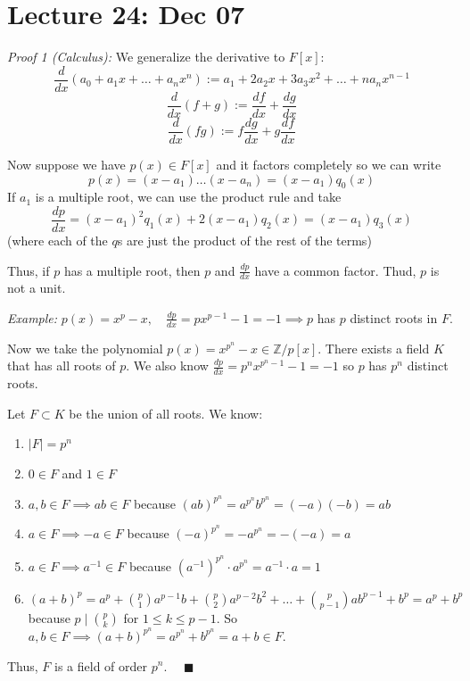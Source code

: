 \documentclass[12pt]{report}
\newcommand{\qed}{\quad \blacksquare}
\newcommand{\Z}{\mathbb{Z}}
\newcommand{\abs}[1]{\left\vert #1 \right\vert}
\newenvironment*{tbox}[3][breakable]{
    \begin{tcolorbox}[
        parbox=false,
        colback=#2!5!white,
        colframe=#2!75!black,
        title={#3},
        #1
    ]}
    {\end{tcolorbox}}
\begin{document}
\section*{Lecture 24: Dec 07}
    \begin{tbox}{gray}{\textbf{Theorem:} If $p$ is prime and $n \geq 1$, there exists a field of order $p^n$}
        \emph{Proof 1 (Calculus):} We generalize the derivative to $F[x]$:
        \[\frac{d}{dx}(a_0 + a_1 x + \dots + a_n x^n) := a_1 + 2a_2 x + 3a_3x^2 + \dots + na_nx^{n-1}\]
        \[\frac{d}{dx}(f +g) := \frac{df}{dx} + \frac{dg}{dx}\]
        \[\frac{d}{dx}(fg) := f\frac{dg}{dx} + g \frac{df}{dx}\]

        Now suppose we have $p(x) \in F[x]$ and it factors completely so we can write 
        \[p(x) = (x - a_1) \dots (x - a_n) = (x - a_1)q_0(x)\]
        If $a_1$ is a multiple root, we can use the product rule and take 
        \[\frac{dp}{dx} = (x - a_1)^2 q_1(x) + 2(x- a_1) q_2(x) = (x - a_1) q_3(x)\]
        (where each of the $q$s are just the product of the rest of the terms)

        Thus, if $p$ has a multiple root, then $p$ and $\frac{dp}{dx}$ have a common factor. Thud, $p$ is not a unit. 

        \emph{Example:} $p(x) = x^p - x, \quad \frac{dp}{dx} = px^{p-1} - 1 = -1 \implies p$ has $p$ distinct roots in $F$.

        Now we take the polynomial $p(x) = x^{p^n} - x \in \Z/p[x]$. There exists a field $K$ that has all roots of $p$. We also know $\frac{dp}{dx} = p^nx^{p^n-1} -1 = -1$ so $p$ has $p^n$ distinct roots. 

        Let $F \subset K$ be the union of all roots. We know:
        \begin{enumerate}
            \item $\abs{F} = p^n$
            \item $0 \in F$ and $1 \in F$
            \item $a, b \in F \implies ab \in F$ because $(ab)^{p^n} = a^{p^n}b^{p^n} = (-a)(-b) = ab$
            \item $a \in F \implies -a \in F$ because $(-a)^{p^n} = -a^{p^n} = -(-a) = a$
            \item $a \in F \implies a^{-1} \in F$ because $(a^{-1})^{p^n} \cdot a^{p^n} = a^{-1} \cdot a = 1$
            \item $(a + b)^p = a^p + \binom{p}{1} a^{p-1}b + \binom{p}{2}a^{p-2}b^2 + \dots + \binom{p}{p-1}ab^{p-1} + b^p = a^p + b^p$ because $p \mid \binom{p}{k}$ for $1 \leq k \leq p-1$. So $a, b \in F \implies (a + b)^{p^n} = a^{p^n} + b^{p^n} = a + b \in F$.
        \end{enumerate}
        Thus, $F$ is a field of order $p^n$. $\qed$ 
    \end{tbox}
\end{document}

